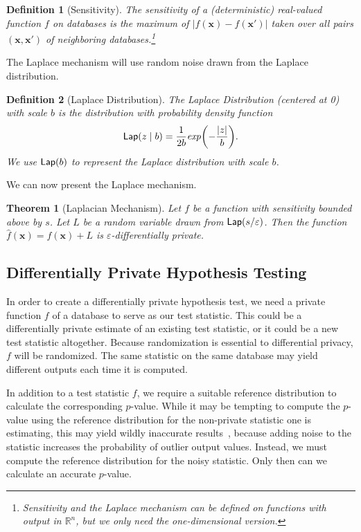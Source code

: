 \documentclass[USenglish,oneside]{article}
\newcounter{ab}
\newcounter{ar}
\newcounter{igh}
\newtheorem{theorem}{Theorem}
\newtheorem{definition}{Definition}
\newcommand{\eps}{\ensuremath{\varepsilon}\xspace}
\newcommand{\lap}{\ensuremath{{\sf Lap}}\xspace}
\newcommand{\x}{\ensuremath{\mathbf{x}}\xspace}
\begin{document}
\begin{definition}[Sensitivity] \label{def:sensitivity}
The sensitivity of a (deterministic) real-valued function $f$ on databases is the maximum of  $\lvert f(\x) - f(\x') \rvert$ taken over all pairs $(\x, \x')$ of neighboring databases.\footnote{Sensitivity and the Laplace mechanism can be defined on functions with output in $\mathbb{R}^n$, but we only need the one-dimensional version.}
\end{definition}

The Laplace mechanism will use random noise drawn from the Laplace distribution.

\begin{definition}[Laplace Distribution] \label{def:laplacedist}
The Laplace Distribution (centered at 0) with scale $b$ is the distribution with probability density function
\begin{equation*}
\lap(z\mid b) = \frac{1}{2b}\text{\emph{exp}}\bigg({-\frac{\lvert z \rvert}{b}}\bigg).
\end{equation*}
We use $\lap(b)$ to represent the Laplace distribution with scale $b$.
\end{definition}

We can now present the Laplace mechanism.

\begin{theorem}[Laplacian Mechanism] \label{thm:lapmechanism}
Let $f$ be a function with sensitivity bounded above by $s$. Let $L$ be a random variable drawn from $\lap(s/\eps)$. Then the function $\hat{f}(\x) = f(\x) + L$ is \eps-differentially private. 
\end{theorem}


\subsection{Differentially Private Hypothesis Testing}
In order to create a differentially private hypothesis test, we need a private function $f$ of a database to serve as our test statistic. This could be a differentially private estimate of an existing test statistic, or it could be a new test statistic altogether. Because randomization is essential to differential privacy, $f$ will be randomized. The same statistic on the same database may yield different outputs each time it is computed.

In addition to a test statistic $f$, we require a suitable reference distribution to calculate the corresponding $p$-value. While it may be tempting to compute the $p$-value using the reference distribution for the non-private statistic one is estimating, this may yield wildly inaccurate results~\cite{campbell2018diffprivanova}, because adding noise to the statistic increases the probability of outlier output values. Instead, we must compute the reference distribution for the noisy statistic. Only then can we calculate an accurate $p$-value. 
\end{document}
